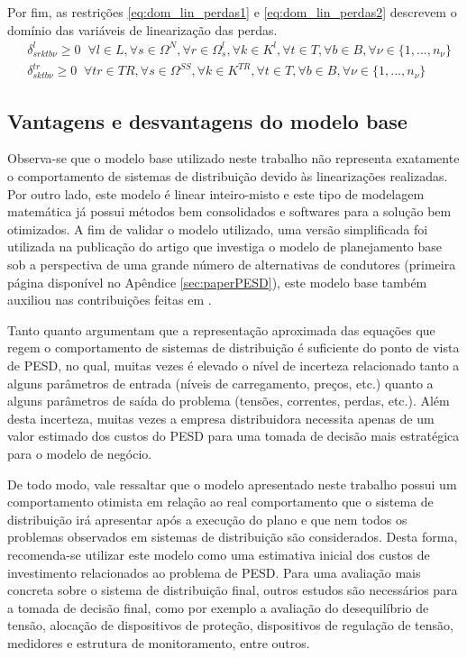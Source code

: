 Por fim, as restrições \eqref{eq:dom_lin_perdas1} e \eqref{eq:dom_lin_perdas2} descrevem o domínio das variáveis de linearização das perdas.
\begin{align}
    &\delta^l_{srktb\nu} \geq 0 \; \; \forall l \in L, \forall s \in \Omega^N, \forall r \in \Omega^l_s, \forall k \in K^l, \forall t \in T, \forall b \in B, \forall \nu \in \{1, ..., n_\nu \} \label{eq:dom_lin_perdas1}\\
    &\delta^{tr}_{sktb\nu} \geq 0 \; \; \forall tr \in TR, \forall s \in \Omega^{SS}, \forall k \in K^{TR}, \forall t \in T, \forall b \in B, \forall \nu \in \{1, ..., n_\nu \} \label{eq:dom_lin_perdas2}
\end{align}

\newpage
\subsection{Vantagens e desvantagens do modelo base}

Observa-se que o modelo base utilizado neste trabalho não representa exatamente o comportamento de sistemas de distribuição devido às linearizações realizadas. Por outro lado, este modelo é linear inteiro-misto e este tipo de modelagem matemática já possui métodos bem consolidados e softwares para a solução bem otimizados. A fim de validar o modelo utilizado, uma versão simplificada foi utilizada na publicação do artigo \cite{9281945} que investiga o modelo de planejamento base sob a perspectiva de uma grande número de alternativas de condutores (primeira página disponível no Apêndice \ref{sec:paperPESD}), este modelo base também auxiliou nas contribuições feitas em \cite{9916750}.

Tanto  quanto  argumentam que a representação aproximada das equações que regem o comportamento de sistemas de distribuição é suficiente do ponto de vista de \ac{PESD}, no qual, muitas vezes é elevado o nível de incerteza relacionado tanto a alguns parâmetros de entrada (níveis de carregamento, preços, etc.) quanto a alguns parâmetros de saída do problema (tensões, correntes, perdas, etc.). Além desta incerteza, muitas vezes a empresa distribuidora necessita apenas de um valor estimado dos custos do \ac{PESD} para uma tomada de decisão mais estratégica para o modelo de negócio.

De todo modo, vale ressaltar que o modelo apresentado neste trabalho possui um comportamento otimista em relação ao real comportamento que o sistema de distribuição irá apresentar após a execução do plano e que nem todos os problemas observados em sistemas de distribuição são considerados. Desta forma, recomenda-se utilizar este modelo como uma estimativa inicial dos custos de investimento relacionados ao problema de \ac{PESD}. Para uma avaliação mais concreta sobre o sistema de distribuição final, outros estudos são necessários para a tomada de decisão final, como por exemplo a avaliação do desequilíbrio de tensão, alocação de dispositivos de proteção, dispositivos de regulação de tensão, medidores e estrutura de monitoramento, entre outros.

